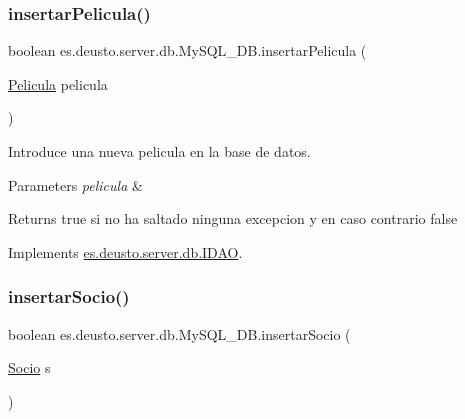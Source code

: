 \mbox{\label{classes_1_1deusto_1_1server_1_1db_1_1_my_s_q_l___d_b_aa78bfb2d1799dcaafbe2d47ded3d137c}} 
\subsubsection{\texorpdfstring{insertarPelicula()}{insertarPelicula()}}
{\footnotesize\ttfamily boolean es.\+deusto.\+server.\+db.\+My\+S\+Q\+L\+\_\+\+D\+B.\+insertar\+Pelicula (\begin{DoxyParamCaption}\item[{\mbox{\hyperlink{classes_1_1deusto_1_1client_1_1data_1_1_pelicula}{Pelicula}}}]{pelicula }\end{DoxyParamCaption})}

Introduce una nueva pelicula en la base de datos. 
\begin{DoxyParams}{Parameters}
{\em pelicula} & \\
\hline
\end{DoxyParams}
\begin{DoxyReturn}{Returns}
true si no ha saltado ninguna excepcion y en caso contrario false 
\end{DoxyReturn}


Implements \mbox{\hyperlink{interfacees_1_1deusto_1_1server_1_1db_1_1_i_d_a_o_ad193e4bfd067962ac138c13af0b786b4}{es.\+deusto.\+server.\+db.\+I\+D\+AO}}.

\mbox{\label{classes_1_1deusto_1_1server_1_1db_1_1_my_s_q_l___d_b_a0959c3a64f052449cb5d79444a2d0900}} 
\subsubsection{\texorpdfstring{insertarSocio()}{insertarSocio()}}
{\footnotesize\ttfamily boolean es.\+deusto.\+server.\+db.\+My\+S\+Q\+L\+\_\+\+D\+B.\+insertar\+Socio (\begin{DoxyParamCaption}\item[{\mbox{\hyperlink{classes_1_1deusto_1_1client_1_1data_1_1_socio}{Socio}}}]{s }\end{DoxyParamCaption})}

